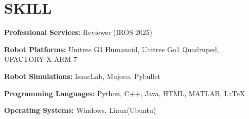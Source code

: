 \documentclass[a4paper,9pt]{extarticle}
\begin{document}
\section*{{\textbf{\fontsize{14pt}{8pt}\selectfont S}\textbf{\scshape KILL}}}
\textbf{Professional Services:} Reviewer (IROS 2025) 
\par\vspace{4pt}\noindent
\textbf{Robot Platforms:}{ Unitree
G1 Humanoid, Unitree Go1 Quadruped, UFACTORY X-ARM 7}
\par\vspace{4pt}\noindent
\textbf{Robot Simulations:}{ IsaacLab, Mujoco, Pybullet}
\par\vspace{4pt}\noindent
\textbf{Programming Languages:}{ Python, C++, Java, HTML, MATLAB, \LaTeX}
\par\vspace{4pt}\noindent
\textbf{Operating Systems:}{ Windows, Linux(Ubuntu)}
\end{document}
